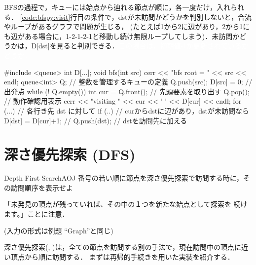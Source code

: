 BFSの過程で，キューには始点から辿れる節点が順に，各一度だけ，入れられる．
\ref{code:bfspy:visit}行目の条件で，dstが未訪問かどうかを判別しないと，合流やループがあるグラフで問題が生じる，
(たとえば1から2に辺があり，2から1にも辺がある場合に，1-2-1-2-1と移動し続け無限ループしてしまう)．未訪問かどうかは，D[dst]を見ると判別できる．\textcolor{white}{この場合は，初期値-1が更新されているかどうか．}

\begin{cbox}[emph={queue,bfs,Q}]
#include <queue>
int D[...];
void bfs(int src) {
    cerr << "bfs root = " << src << endl;
    queue<int> Q; // 整数を管理するキューの定義
    Q.push(src);
    D[src] = 0; // 出発点
    while (! Q.empty()) {
        int cur = Q.front(); // 先頭要素を取り出す
        Q.pop();
        // 動作確認用表示
        cerr << "visiting " << cur << ' ' << D[cur] << endl;
        for (...) { // 各行き先 dst に対して
            if (..) { // curからdstに辺があり，dstが未訪問なら
                D[dst] = D[cur]+1; // 
                Q.push(dst); // dstを訪問先に加える
            } 
        }
    }
}  
\end{cbox}


\section{深さ優先探索 (DFS)}\label{section:dfs}

\begin{pbox}{Depth First Search}{AOJ}
番号の若い順に節点を深さ優先探索で訪問する時に，その訪問順序を表示せよ

「未発見の頂点が残っていれば、その中の１つを新たな始点として探索を
続けます。」ことに注意．

(入力の形式は例題 ``Graph''と同じ)

\end{pbox}

深さ優先探索(\pcaojbook[pp.~273--], \pccbook[p.~33])は，全ての節点を訪問する別の手法で，現在訪問中の頂点に近い頂点から順に訪問する．
まずは再帰的手続きを用いた実装を紹介する．

